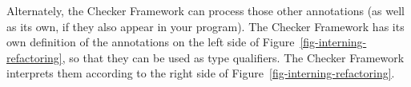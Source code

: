 Alternately, the Checker Framework can process those other annotations (as
well as its own, if they also appear in your program).  The Checker
Framework has its own definition of the annotations on the left side of
Figure~\ref{fig-interning-refactoring}, so that they can be used as type
qualifiers.  The Checker Framework interprets them according to the right
side of Figure~\ref{fig-interning-refactoring}.



